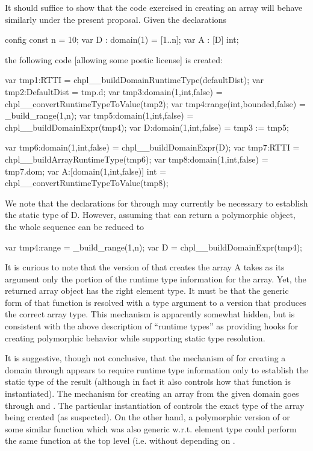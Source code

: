 \begin{chapelexample}
It should suffice to show that the code exercised in creating an array will
behave similarly under the present proposal.  Given the declarations
\begin{chapel}
config const n = 10;
var D : domain(1) = [1..n];
var A : [D] int;
\end{chapel}
\noindent
the following code [allowing some poetic license] is created:
\begin{chapel}
var tmp1:RTTI = chpl__buildDomainRuntimeType(defaultDist);
var tmp2:DefaultDist = tmp.d;
var tmp3:domain(1,int,false) = chpl__convertRuntimeTypeToValue(tmp2);
var tmp4:range(int,bounded,false) = _build_range(1,n);
var tmp5:domain(1,int,false) = chpl__buildDomainExpr(tmp4);
var D:domain(1,int,false) = tmp3 := tmp5;

var tmp6:domain(1,int,false) = chpl__buildDomainExpr(D);
var tmp7:RTTI = chpl__buildArrayRuntimeType(tmp6);
var tmp8:domain(1,int,false) = tmp7.dom;
var A:[domain(1,int,false)] int = chpl__convertRuntimeTypeToValue(tmp8);
\end{chapel}
We note that the declarations for  through  may currently
be necessary to establish the static type of D.  However, assuming that
 can return a polymorphic object, the whole sequence can
be reduced to 
\begin{chapel}
var tmp4:range = _build_range(1,n);
var D = chpl__buildDomainExpr(tmp4);
\end{chapel}

It is curious to note that the version
of  that creates the array A takes as
its argument only the  portion of the runtime type information for
the array.  Yet, the returned array object has the right element type.  It must
be that the generic form of that function is resolved with a type argument to a
version that produces the correct array type.  This mechanism is apparently
somewhat hidden, but is consistent with the above description of ``runtime
types'' as providing hooks for creating polymorphic behavior while supporting
static type resolution.

It is suggestive, though not conclusive, that the mechanism of
for creating a domain through  appears to require runtime
type information only to establish the static type of the result (although in
fact it also controls how that function is instantiated).  The mechanism for
creating an array from the given domain goes through  and
.  The particular instantiation of
 controls the exact type of the array being
created (as suspected).  On the other hand, a polymorphic version of
 or some similar function which was also generic w.r.t. element type
could perform the same function at the top level (i.e. without depending on
.


\end{chapelexample}
